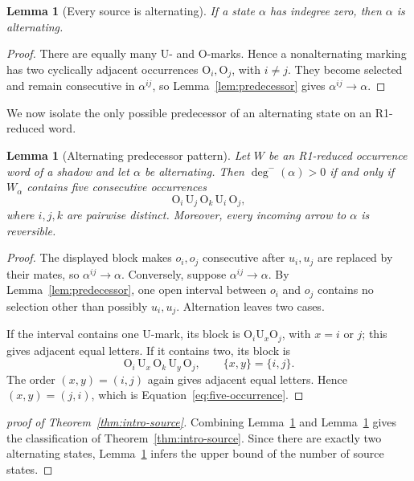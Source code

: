 \documentclass[11pt]{amsart}
\newtheorem{lemma}[theorem]{Lemma}
\theoremstyle{definition}
\theoremstyle{remark}
\begin{document}
\begin{lemma}[Every source is alternating]\label{lem:source-alternating}
If a state \(\alpha\) has indegree zero, then \(\alpha\) is alternating.
\end{lemma}

\begin{proof}
There are equally many \(\mathrm U\)- and \(\mathrm O\)-marks.  Hence a
nonalternating marking has two cyclically adjacent occurrences
\(\mathrm O_i,\mathrm O_j\), with \(i\ne j\).  They become selected and
remain consecutive in \(\alpha^{ij}\), so
Lemma~\ref{lem:predecessor} gives \(\alpha^{ij}\to\alpha\).
\end{proof}

We now isolate the only possible predecessor of an alternating state on an
R1-reduced word.

\begin{lemma}[Alternating predecessor pattern]
\label{lem:alternating-pattern}
Let \(W\) be an R1-reduced occurrence word of a shadow and let \(\alpha\) be
alternating.  Then \(\deg^-(\alpha)>0\) if and only if \(W_\alpha\) contains
five consecutive occurrences
\begin{equation}\label{eq:five-occurrence}
  \mathrm O_i\,\mathrm U_j\,\mathrm O_k\,
  \mathrm U_i\,\mathrm O_j,
\end{equation}
where \(i,j,k\) are pairwise distinct.  Moreover, every incoming arrow to
\(\alpha\) is reversible.
\end{lemma}

\begin{proof}
The displayed block makes \(o_i,o_j\) consecutive after \(u_i,u_j\) are
replaced by their mates, so \(\alpha^{ij}\to\alpha\).  Conversely, suppose
\(\alpha^{ij}\to\alpha\).  By Lemma~\ref{lem:predecessor}, one open interval
between \(o_i\) and \(o_j\) contains no selection other than possibly
\(u_i,u_j\).  Alternation leaves two cases.

If the interval contains one \(\mathrm U\)-mark, its block is
\(\mathrm O_i\mathrm U_x\mathrm O_j\), with \(x=i\) or \(j\); this gives
adjacent equal letters.  If it contains two, its block is
\[
  \mathrm O_i\,\mathrm U_x\,\mathrm O_k\,
  \mathrm U_y\,\mathrm O_j,
  \qquad \{x,y\}=\{i,j\}.
\]
The order \((x,y)=(i,j)\) again gives adjacent equal letters.  Hence
\((x,y)=(j,i)\), which is Equation~\eqref{eq:five-occurrence}. 
\end{proof}

\begin{proof}[proof of Theorem~\ref{thm:intro-source}]
Combining Lemma~\ref{lem:source-alternating} and
Lemma~\ref{lem:alternating-pattern} gives the classification of
Theorem~\ref{thm:intro-source}. Since there are exactly two alternating states, Lemma~\ref{lem:source-alternating} infers the upper bound of the number of source states.
\end{proof}
\end{document}
